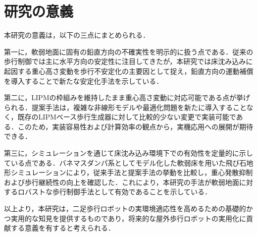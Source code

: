 \section{研究の意義}

本研究の意義は，以下の三点にまとめられる．

第一に，軟弱地面に固有の鉛直方向の不確実性を明示的に扱う点である．従来の歩行制御では主に水平方向の安定性に注目してきたが，本研究では床沈み込みに起因する重心高さ変動を歩行不安定化の主要因として捉え，鉛直方向の運動補償を導入することで新たな安定化手法を示している．

第二に，LIPMの枠組みを維持したまま重心高さ変動に対応可能である点が挙げられる．提案手法は，複雑な非線形モデルや最適化問題を新たに導入することなく，既存のLIPMベース歩行生成器に対して比較的少ない変更で実装可能である．このため，実装容易性および計算効率の観点から，実機応用への展開が期待できる．

第三に，シミュレーションを通じて床沈み込み環境下での有効性を定量的に示している点である．バネマスダンパ系としてモデル化した軟弱床を用いた飛び石地形シミュレーションにより，従来手法と提案手法の挙動を比較し，重心発散抑制および歩行継続性の向上を確認した．これにより，本研究の手法が軟弱地面に対するロバストな歩行制御手法として有効であることを示している．

以上より，本研究は，二足歩行ロボットの実環境適応性を高めるための基礎的かつ実用的な知見を提供するものであり，将来的な屋外歩行ロボットの実用化に貢献する意義を有すると考えられる．